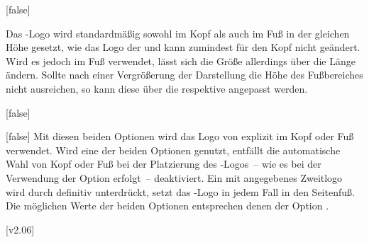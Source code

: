 \begin{Declaration*}{}
\begin{Declaration*}{}
\begin{Declaration*}{}
\begin{Declaration}[%
  v2.02:Logo von \DDC automatisch in Kopf/Fuß;%
  v2.02!\Option{ddc=colorblack};
  v2.02!\Option{ddc=gray};
  v2.02!\Option{ddc=black};
  v2.02!\Option{ddc=blue};
  v2.02!\Option{ddc=white};
]{}[false]
\begin{values}{}
\end{values}
%
Das \DDC-Logo wird standardmäßig sowohl im Kopf als auch im Fuß in der gleichen 
Höhe gesetzt, wie das Logo der \TnUD und kann zumindest für den Kopf nicht 
geändert. Wird es jedoch im Fuß verwendet, lässt sich die Größe allerdings über 
die Länge  ändern. Sollte nach einer Vergrößerung der 
Darstellung die Höhe des Fußbereiches nicht ausreichen, so kann diese über die 
 respektive 
 angepasst werden.
\end{Declaration}

\begin{Declaration}[v2.02]{}[false]
\begin{Declaration}[%
  v2.02!\Option{ddcfoot=colorblack};
  v2.02!\Option{ddcfoot=gray};
  v2.02!\Option{ddcfoot=black};
  v2.02!\Option{ddcfoot=blue};
  v2.02!\Option{ddcfoot=white};
]{}[false]
\printdeclarationlist%
%
%
%
%
%
Mit diesen beiden Optionen wird das Logo von \DDC explizit im Kopf oder Fuß 
verwendet. Wird eine der beiden Optionen genutzt, entfällt die automatische 
Wahl von Kopf oder Fuß bei der Platzierung des \DDC-Logos~-- wie es bei der 
Verwendung der Option  erfolgt~-- deaktiviert. Ein mit
 angegebenes Zweitlogo wird durch  
definitiv unterdrückt,  setzt das \DDC-Logo in jedem Fall 
in den Seitenfuß. Die möglichen Werte der beiden Optionen entsprechen denen der 
Option .
%
\end{Declaration}
\end{Declaration}

[v2.06]


\end{Declaration*}
\end{Declaration*}
\end{Declaration*}
